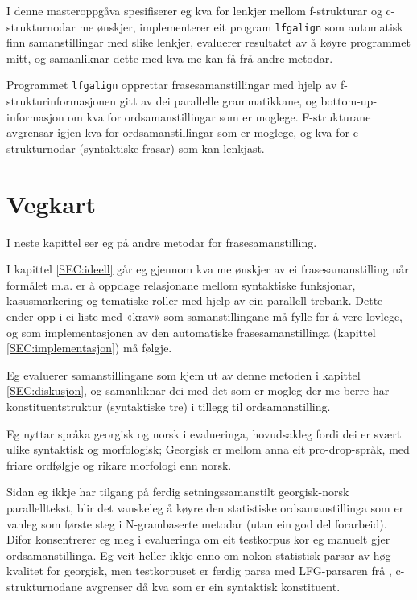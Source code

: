 \documentclass[11pt,a4paper,oneside,draft]{book}
\begin{document}
I denne masteroppgåva spesifiserer eg kva for lenkjer mellom
f-strukturar og c-strukturnodar me ønskjer, implementerer eit program
\texttt{lfgalign} som automatisk finn samanstillingar med slike lenkjer,
evaluerer resultatet av å køyre programmet mitt, og samanliknar dette
med kva me kan få frå andre metodar.

Programmet \texttt{lfgalign} opprettar frasesamanstillingar med hjelp av
f-strukturinformasjonen gitt av dei parallelle grammatikkane, og
bottom-up-informasjon om kva for ordsamanstillingar som er
moglege. F-strukturane avgrensar igjen kva for ordsamanstillingar som
er moglege, og kva for c-strukturnodar (syntaktiske frasar) som kan
lenkjast.


\section{Vegkart}
\label{sec-1.1}

I neste kapittel ser eg på andre metodar for frasesamanstilling.

I kapittel \ref{SEC:ideell} går eg gjennom kva me ønskjer av ei
frasesamanstilling når formålet m.a. er å oppdage relasjonane mellom
syntaktiske funksjonar, kasusmarkering og tematiske roller med hjelp
av ein parallell trebank. Dette ender opp i ei liste med «krav» som
samanstillingane må fylle for å vere lovlege, og som implementasjonen
av den automatiske frasesamanstillinga (kapittel
\ref{SEC:implementasjon}) må følgje.

Eg evaluerer samanstillingane som kjem ut av denne metoden i kapittel
\ref{SEC:diskusjon}, og samanliknar dei med det som er mogleg der me
berre har konstituentstruktur (syntaktiske tre) i tillegg til
ordsamanstilling.

Eg nyttar språka georgisk og norsk i evalueringa, hovudsakleg fordi
dei er svært ulike syntaktisk og morfologisk; Georgisk er mellom anna
eit pro-drop-språk, med friare ordfølgje og rikare morfologi enn
norsk.  

Sidan eg ikkje har tilgang på ferdig setningssamanstilt georgisk-norsk
parallelltekst, blir det vanskeleg å køyre den statistiske
ordsamanstillinga som er vanleg som første steg i N-grambaserte
metodar (utan ein god del forarbeid). Difor konsentrerer eg meg i
evalueringa om eit testkorpus kor eg manuelt gjer
ordsamanstillinga. Eg veit heller ikkje enno om nokon statistisk
parsar av høg kvalitet for georgisk, men testkorpuset er ferdig parsa
med LFG-parsaren frå \citet{meurer2008cgg}, c-strukturnodane avgrenser
då kva som er ein syntaktisk konstituent.
\end{document}
